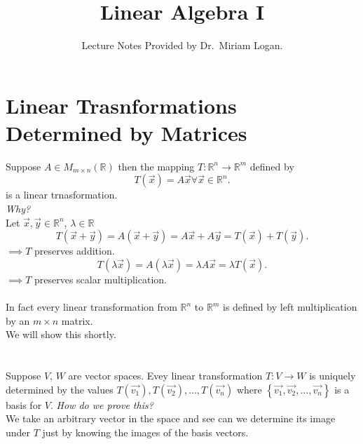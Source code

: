 \documentclass{report}
\begin{document}
\title{Linear Algebra I}
\author{Lecture Notes Provided by Dr.~Miriam Logan.}
\date{}
\maketitle
\tableofcontents
\newpage  
\section{Linear Trasnformations Determined by Matrices}
 Suppose $ A \in M _{ m \times  n}\left(  \mathbb{R}\right) $                                                 then the mapping $ T: \mathbb{R} ^{n} \to \mathbb{R} ^{m}$ defined by 
 \[
 T \left( \vec{ x}  \right) = A \vec{ x} \forall  \vec{ x} \in \mathbb{R} ^{n}
 .\]                    is a linear trnasformation.\\
 \textit{Why?} \\
 Let $ \vec{ x} , \vec{ y}  \in \mathbb{R}^{n} $, $ \lambda \in \mathbb{R}$
 \[
 T \left( \vec{ x} + \vec{ y}  \right) = A \left( \vec{ x} + \vec{ y}  \right) = A \vec{ x} + A \vec{ y} = T \left( \vec{ x}  \right) + T \left( \vec{ y}  \right)
 .\] 
 $ \implies T$ preserves addition.\\
 \[
 T \left( \lambda \vec{ x}  \right) = A \left( \lambda \vec{ x}  \right) = \lambda A \vec{ x} = \lambda T \left( \vec{ x}  \right)
 .\] 
 $ \implies T$ preserves scalar multiplication.\\
 \\
 In fact every linear transformation from $ \mathbb{R} ^{n}$ to $ \mathbb{R} ^{m}$ is defined by left multiplication by an $ m \times n$ matrix.\\
 We will show this shortly.\\
 \\
 \\
 \thm{}
 {
	 Suppose $ V$, $ W$ are vector spaces. Evey linear transformation $ T: V \to W$ is uniquely determined by the values $ T \left(  \vec{ v_1}  \right) , T \left( \vec{ v_2}  \right) , \ldots , T \left( \vec{ v_n}  \right) $ where $ \left\{ \vec{ v_1} ,\vec{ v_2} ,\ldots , \vec{ v_n}  \right\}$ is a basis for $ V$.
 }
  \textit{How do we prove this?} \\
  We take an arbitrary vector in the space and see can we determine its image under $ T$ just by knowing the images of the basis vectors.\\
  \\
\end{document}

